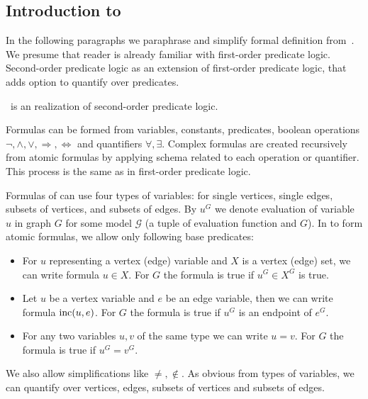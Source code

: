\subsection{Introduction to~\MSO{}}

In the following paragraphs we paraphrase and simplify formal definition
from~\cite{book_parametrized_algorithms}.
We presume that reader is already familiar with first-order predicate logic.
Second-order predicate logic as an extension of first-order predicate logic,
that adds option to quantify over predicates.

\MSO{}~is an realization of second-order predicate logic.
\todo[inline]
{ TODO Switch to footnote, currently, it raises exceptions in NVim ;)

	We need second-order logic as quantification over subsets of vertices or edges
	corresponds to quantification over predicates separating the subsets.
	Without this requirement we could talk
	about monadic first-order logic \( \text{MSO}_1 \).
}

Formulas can be formed from
variables, constants, predicates,
boolean operations \( \lnot, \land, \lor, \Rightarrow, \Leftrightarrow \)
and quantifiers \( \forall, \exists \).
Complex formulas are created recursively from atomic formulas
by applying schema related to each operation or quantifier.
This process is the same as in first-order predicate logic.

Formulas of \MSO{} can use four types of variables:
for single vertices, single edges, subsets of vertices, and subsets of edges.
By \( u^G \) we denote evaluation of variable \( u \) in graph \( G \)
for some model \( \mathcal{G} \) (a tuple of evaluation function and \( G \)).
In \MSO{} to form atomic formulas, we allow only following base predicates:
%
\begin{itemize}
	\item For \( u \) representing a vertex (edge) variable
	      and \( X \) is a vertex (edge) set,
	      we can write formula \( u \in X \).
	      For \( G \) the formula is true if \( u^G \in X^G \) is true.
	\item Let \( u \) be a vertex variable and \( e \) be an edge variable,
	      then we can write formula \( \text{inc} (u, e) \).
	      For \( G \) the formula is true if \( u^G \) is an endpoint of \( e^G \).
	\item For any two variables \( u, v \) of the same type we can write \( u = v \).
	      For \( G \) the formula is true if \( u^G = v^G \).
\end{itemize}
%
We also allow simplifications like \( \ne, \not\in \).
As obvious from types of variables, we can quantify over vertices, edges,
subsets of vertices and subsets of edges.

